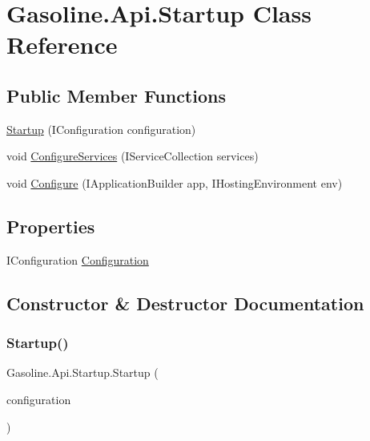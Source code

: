 \hypertarget{class_gasoline_1_1_api_1_1_startup}{}\section{Gasoline.\+Api.\+Startup Class Reference}
\label{class_gasoline_1_1_api_1_1_startup}
\subsection*{Public Member Functions}
\begin{DoxyCompactItemize}
\item 
\mbox{\hyperlink{class_gasoline_1_1_api_1_1_startup_a91e97a28bbfa9e6bd0ed4371601c316b}{Startup}} (I\+Configuration configuration)
\item 
void \mbox{\hyperlink{class_gasoline_1_1_api_1_1_startup_af1ee50088822e888762174314b414ba8}{Configure\+Services}} (I\+Service\+Collection services)
\item 
void \mbox{\hyperlink{class_gasoline_1_1_api_1_1_startup_a2b46ce7aee8154a80a284762e6d37fc7}{Configure}} (I\+Application\+Builder app, I\+Hosting\+Environment env)
\end{DoxyCompactItemize}
\subsection*{Properties}
\begin{DoxyCompactItemize}
\item 
I\+Configuration \mbox{\hyperlink{class_gasoline_1_1_api_1_1_startup_a8cc1490423d1f190b2a6332c2e849447}{Configuration}}
\end{DoxyCompactItemize}


\subsection{Constructor \& Destructor Documentation}
\mbox{\label{class_gasoline_1_1_api_1_1_startup_a91e97a28bbfa9e6bd0ed4371601c316b}} 
\subsubsection{\texorpdfstring{Startup()}{Startup()}}
{\footnotesize\ttfamily Gasoline.\+Api.\+Startup.\+Startup (\begin{DoxyParamCaption}\item[{I\+Configuration}]{configuration }\end{DoxyParamCaption})}



